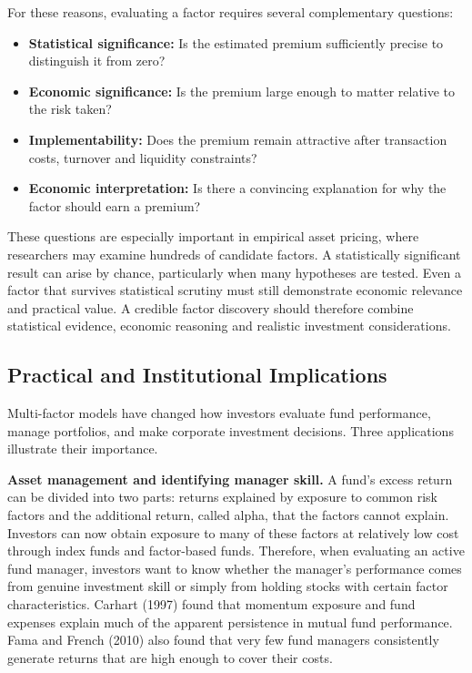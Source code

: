 For these reasons, evaluating a factor requires several complementary questions:

\begin{itemize}
  \item \textbf{Statistical significance:} Is the estimated premium sufficiently precise to distinguish it from zero?
  \item \textbf{Economic significance:} Is the premium large enough to matter relative to the risk taken?
  \item \textbf{Implementability:} Does the premium remain attractive after transaction costs, turnover and liquidity constraints?
  \item \textbf{Economic interpretation:} Is there a convincing explanation for why the factor should earn a premium?
\end{itemize}

These questions are especially important in empirical asset pricing, where researchers may examine hundreds of candidate factors. A statistically significant result can arise by chance, particularly when many hypotheses are tested. Even a factor that survives statistical scrutiny must still demonstrate economic relevance and practical value. A credible factor discovery should therefore combine statistical evidence, economic reasoning and realistic investment considerations.



\subsection{Practical and Institutional Implications}
\label{sec:03-implications}

Multi-factor models have changed how investors evaluate fund
performance, manage portfolios, and make corporate investment
decisions. Three applications illustrate their importance.

\textbf{Asset management and identifying manager skill.}
A fund's excess return can be divided into two parts: returns
explained by exposure to common risk factors and the additional
return, called alpha, that the factors cannot explain. Investors
can now obtain exposure to many of these factors at relatively
low cost through index funds and factor-based funds. Therefore,
when evaluating an active fund manager, investors want to know
whether the manager's performance comes from genuine investment
skill or simply from holding stocks with certain factor
characteristics. Carhart (1997) found that momentum exposure and
fund expenses explain much of the apparent persistence in mutual
fund performance. Fama and French (2010) also found that very few
fund managers consistently generate returns that are high enough
to cover their costs.

